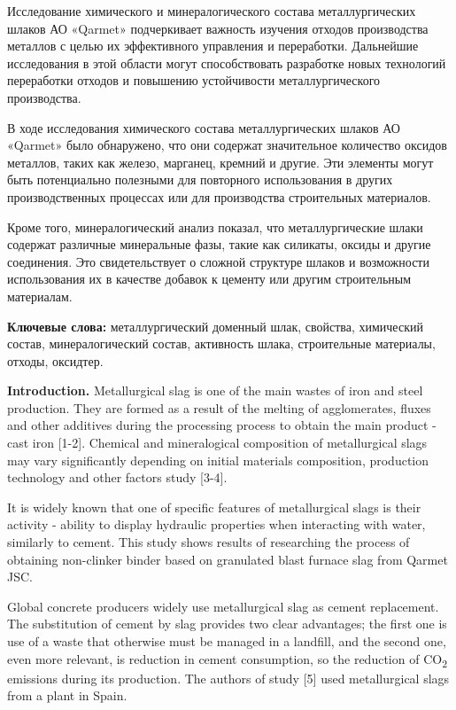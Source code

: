 Исследование химического и минералогического состава металлургических
шлаков АО «Qarmet» подчеркивает важность изучения отходов производства
металлов с целью их эффективного управления и переработки. Дальнейшие
исследования в этой области могут способствовать разработке новых
технологий переработки отходов и повышению устойчивости
металлургического производства.

В ходе исследования химического состава металлургических шлаков АО
«Qarmet» было обнаружено, что они содержат значительное количество
оксидов металлов, таких как железо, марганец, кремний и другие. Эти
элементы могут быть потенциально полезными для повторного использования
в других производственных процессах или для производства строительных
материалов.

Кроме того, минералогический анализ показал, что металлургические шлаки
содержат различные минеральные фазы, такие как силикаты, оксиды и другие
соединения. Это свидетельствует о сложной структуре шлаков и возможности
использования их в качестве добавок к цементу или другим строительным
материалам.

{\bfseries Ключевые слова:} металлургический доменный шлак, свойства,
химический состав, минералогический состав, активность шлака,
строительные материалы, отходы, оксидтер.

{\bfseries Introduction.} Metallurgical slag is one of the main wastes of
iron and steel production. They are formed as a result of the melting of
agglomerates, fluxes and other additives during the processing process
to obtain the main product - cast iron {[}1-2{]}. Chemical and
mineralogical composition of metallurgical slags may vary significantly
depending on initial materials\textquotesingle{} composition, production
technology and other factors study {[}3-4{]}.

It is widely known that one of specific features of metallurgical slags
is their activity - ability to display hydraulic properties when
interacting with water, similarly to cement. This study shows results of
researching the process of obtaining non-clinker binder based on
granulated blast furnace slag from Qarmet JSC.

Global concrete producers widely use metallurgical slag as cement
replacement. The substitution of cement by slag provides two clear
advantages; the first one is use of a waste that otherwise must be
managed in a landfill, and the second one, even more relevant, is
reduction in cement consumption, so the reduction of CO\textsubscript{2}
emissions during its production. The authors of study {[}5{]} used
metallurgical slags from a plant in Spain.

